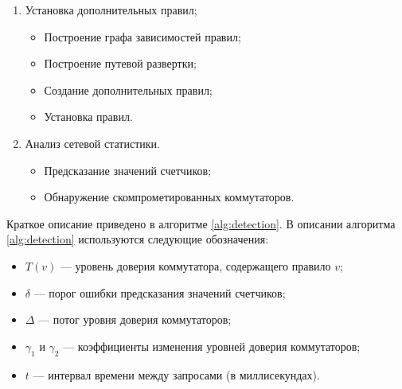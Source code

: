 \documentclass[14pt,autoref,href]{disser}
\theoremstyle{definition}
\begin{document}
\begin{enumerate}
\item Установка дополнительных правил;
    \begin{itemize}
    \item Построение графа зависимостей правил;
    \item Построение путевой развертки;
    \item Создание дополнительных правил;
    \item Установка правил.
    \end{itemize}
\item Анализ сетевой статистики.
    \begin{itemize}
    \item Предсказание значений счетчиков;
    \item Обнаружение скомпрометированных коммутаторов.
    \end{itemize}
\end{enumerate}

Краткое описание приведено в алгоритме \ref{alg:detection}.
В описании алгоритма \ref{alg:detection} используются следующие обозначения:
\begin{itemize}
\item $T(v)$ --- уровень доверия коммутатора, содержащего правило $v$;
\item $\delta$ --- порог ошибки предсказания значений счетчиков;
\item $\Delta$ --- потог уровня доверия коммутаторов;
\item $\gamma_1$ и $\gamma_2$ --- коэффициенты изменения уровней доверия коммутаторов;
\item $t$ --- интервал времени между запросами (в миллисекундах).
\end{itemize}
\end{document}
